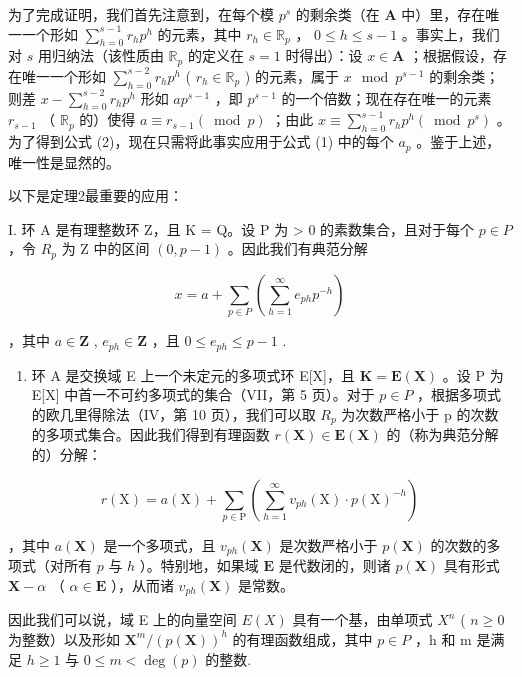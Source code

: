 为了完成证明，我们首先注意到，在每个模 \(p^s\) 的剩余类（在 \(\mathbf{A}\) 中）里，存在唯一一个形如 \(\sum_{h=0}^{s-1} r_h p^h\) 的元素，其中 \(r_h \in \mathbb{R}_p\) ， \(0 \leqslant h \leqslant s-1\) 。事实上，我们对 \(s\) 用归纳法（该性质由 \(\mathbb{R}_p\) 的定义在 \(s=1\) 时得出）：设 \(x \in \mathbf{A}\) ；根据假设，存在唯一一个形如 \(\sum_{h=0}^{s-2} r_h p^h\) ( \(r_h \in \mathbb{R}_p\) ) 的元素，属于 \(x \mod p^{s-1}\) 的剩余类；则差 \(x - \sum_{h=0}^{s-2} r_h p^h\) 形如 \(ap^{s-1}\) ，即 \(p^{s-1}\) 的一个倍数；现在存在唯一的元素 \(r_{s-1}\) （ \(\mathbb{R}_p\) 的）使得 \(a \equiv r_{s-1} (\bmod p)\) ；由此 \(x \equiv \sum_{h=0}^{s-1} r_h p^h (\bmod p^s)\) 。为了得到公式 (2)，现在只需将此事实应用于公式 (1) 中的每个 \(a_p\) 。鉴于上述，唯一性是显然的。

以下是定理2最重要的应用：

I. 环 A 是有理整数环 Z，且 K = Q。设 P 为 \textgreater{} 0 的素数集合，且对于每个 \(p \in P\) ，令 \(R_{p}\) 为 Z 中的区间 \((0, p - 1)\) 。因此我们有典范分解

\[
x = a + \sum_ {p \in P} \left(\sum_ {h = 1} ^ {\infty} e _ {p h} p ^ {- h}\right)
\]

，其中 \(a \in \mathbf{Z}\) , \(e_{ph} \in \mathbf{Z}\) ，且 \(0 \leqslant e_{ph} \leqslant p - 1\) .

\begin{enumerate}
\def\labelenumi{\Roman{enumi}.}
\setcounter{enumi}{1}
\tightlist
\item
  环 A 是交换域 E 上一个未定元的多项式环 E{[}X{]}，且 \(\mathbf{K} = \mathbf{E}(\mathbf{X})\) 。设 P 为 E{[}X{]} 中首一不可约多项式的集合（VII，第 5 页）。对于 \(p \in P\) ，根据多项式的欧几里得除法（IV，第 10 页），我们可以取 \(R_{p}\) 为次数严格小于 p 的次数的多项式集合。因此我们得到有理函数 \(r(\mathbf{X}) \in \mathbf{E}(\mathbf{X})\) 的（称为典范分解的）分解：
\end{enumerate}

\[
r (\mathrm{X}) = a (\mathrm{X}) + \sum_ {p \in \mathrm{P}} \left(\sum_ {h = 1} ^ {\infty} v _ {p h} (\mathrm{X}) \cdot p (\mathrm{X}) ^ {- h}\right)
\]

，其中 \(a(\mathbf{X})\) 是一个多项式，且 \(v_{ph}(\mathbf{X})\) 是次数严格小于 \(p(\mathbf{X})\) 的次数的多项式（对所有 \(p\) 与 \(h\) ）。特别地，如果域 \(\mathbf{E}\) 是代数闭的，则诸 \(p(\mathbf{X})\) 具有形式 \(\mathbf{X} - \alpha\) （ \(\alpha \in \mathbf{E}\) ），从而诸 \(v_{ph}(\mathbf{X})\) 是常数。

因此我们可以说，域 E 上的向量空间 \(E(X)\) 具有一个基，由单项式 \(X^{n}\) ( \(n \geqslant 0\) 为整数）以及形如 \(\mathbf{X}^{m}/(p(\mathbf{X}))^{h}\) 的有理函数组成，其中 \(p \in P\) ，h 和 m 是满足 \(h \geqslant 1\) 与 \(0 \leqslant m < \deg(p)\) 的整数.

